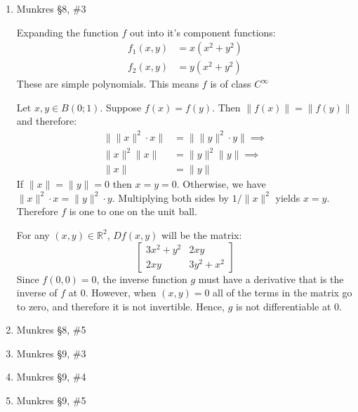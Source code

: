 \documentclass[letterpaper,10pt]{article}
\begin{document}
\begin{enumerate}
	\item Munkres \S8, \#3

	Expanding the function $f$ out into it's component functions:
	\begin{align*}
		f_1(x,y) & = x(x^2 + y^2) \\
		f_2(x,y) & = y(x^2 + y^2) 
	\end{align*}
	These are simple polynomials. This means $f$ is of class $C^{\infty}$

	Let $x, y \in B(0;1)$. Suppose $f(x) = f(y)$. Then $\|f(x)\| = \|f(y)\|$ and therefore:
	\begin{align*}
		\| \|x\|^2 \cdot x \| &=  \| \|y\|^2 \cdot y \| \implies \\
		\|x\|^2 \| x \| &=  \|y\|^2 \| y \| \implies \\
		\|x\| &=  \|y\| 
	\end{align*}
	If $\|x\| = \|y\| = 0$ then $x = y = 0$. Otherwise, we have $\|x\|^2 \cdot x = \|y\|^2 \cdot y$. Multiplying both sides by $1/\|x\|^2$ yields $x = y$. Therefore $f$ is one to one on the unit ball.

	For any $(x, y) \in \mathbb{R}^2$, $Df(x,y)$ will be the matrix:
	 $$\left[ \begin{matrix} 
	  3 x^2 + y^2 & 2xy \\
		2xy & 3y^2 + x^2
	 \end{matrix} \right] 
	  $$
	Since $f(0, 0) = 0$, the inverse function $g$ must have a derivative that is the inverse of $f$ at 0.  However, when $(x,y) = 0$ all of the terms in the matrix go to zero, and therefore it is not invertible. Hence, $g$ is not differentiable at 0.

	\item Munkres \S8, \#5
	

	\item Munkres \S9, \#3
	\item Munkres \S9, \#4
	\item Munkres \S9, \#5

\end{enumerate}
\end{document}
